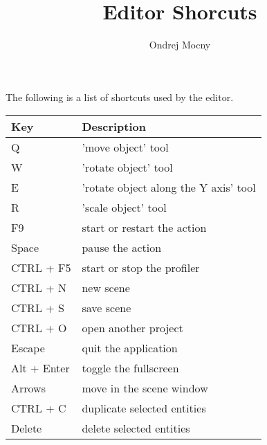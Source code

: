 \documentclass[a4paper, 12pt]{report}
\begin{document}
\pagestyle{empty} %

\title{Editor Shorcuts}
\author{Ondrej Mocny}

\pagestyle{plain} %

The following is a list of shortcuts used by the editor.

\begin{tabular}{|p{0.16\hsize}|p{0.7\hsize}|}
  \hline
  Key & Description \\
	\hline
	Q & 'move object' tool \\
	W & 'rotate object' tool \\
	E & 'rotate object along the Y axis' tool \\
	R & 'scale object' tool \\
	\hline
	F9 & start or restart the action \\
	Space & pause the action \\
	\hline
	CTRL + F5 & start or stop the profiler \\
	CTRL + N & new scene \\
	CTRL + S & save scene \\
	CTRL + O & open another project \\
	Escape & quit the application \\
	Alt + Enter & toggle the fullscreen \\
	\hline
	Arrows & move in the scene window \\
	CTRL + C & duplicate selected entities \\
	Delete & delete selected entities \\
	\hline
\end{tabular}
\end{document}
